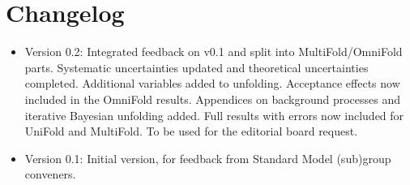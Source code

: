 \section{Changelog}

\begin{itemize}
\item Version 0.2: Integrated feedback on v0.1 and split into MultiFold/OmniFold parts. Systematic uncertainties updated and theoretical uncertainties completed. Additional variables added to unfolding. Acceptance effects now included in the OmniFold results. Appendices on background processes and iterative Bayesian unfolding added.  Full results with errors now included for UniFold and MultiFold. To be used for the editorial board request.
\item Version 0.1: Initial version, for feedback from Standard Model (sub)group conveners.
\end{itemize}
